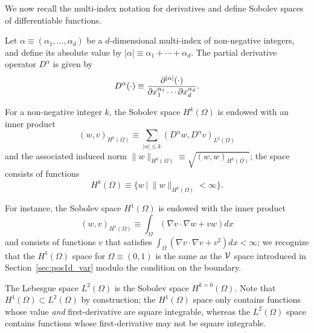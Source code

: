 We now recall the multi-index notation for derivatives and define Sobolev spaces of differentiable functions.
\begin{definition}
  Let $\alpha \equiv (\alpha_1, \dots, \alpha_d)$ be a $d$-dimensional multi-index of non-negative integers, and define its absolute value by $|\alpha| \equiv \alpha_1 + \cdots + \alpha_d$. The partial derivative operator $D^\alpha$ is given by 
  \begin{equation*}
    D^\alpha (\cdot)  \equiv \frac{\partial ^{|\alpha|} (\cdot)}{\partial x_1^{\alpha_1}  \cdots \partial x_d^{\alpha_d}}.
  \end{equation*}
\end{definition}
\begin{definition}
  For a non-negative integer $k$, the Sobolev space $H^k(\Omega)$ is endowed with an inner product
  \begin{equation*}
    (w,v)_{H^k(\Omega)} \equiv \sum_{|\alpha| \leq k} (D^\alpha w, D^\alpha v)_{L^2(\Omega)}
  \end{equation*}
  and the associated induced norm $\| w \|_{H^k(\Omega)} \equiv \sqrt{(w,w)_{H^k(\Omega)}}$; the space consists of functions
  \begin{equation*}
    H^k(\Omega) \equiv \{ w \ | \ \| w \|_{H^k(\Omega)} < \infty \}.
  \end{equation*}
\end{definition}
For instance, the Sobolev space $H^1(\Omega)$ is endowed with the inner product
\begin{equation*}
  (w,v)_{H^1(\Omega)} \equiv \int_\Omega ( \nabla v \cdot \nabla w + v w ) dx
\end{equation*}
and consists of functions $v$ that satisfies $\int_\Omega (\nabla v \cdot \nabla v + v^2) dx < \infty$; we recognize that the $H^1(\Omega)$ space for $\Omega \equiv (0,1)$ is the same as the $\mathcal{V}$ space introduced in Section~\ref{sec:pos1d_var} modulo the condition on the boundary.
 
The Lebesgue space $L^2(\Omega)$ is the Sobolev space $H^{k=0}(\Omega)$. Note that $H^1(\Omega) \subset L^2(\Omega)$ by construction; the $H^1(\Omega)$ space only contains functions whose value \emph{and} first-derivative are square integrable, whereas the $L^2(\Omega)$ space contains functions whose first-derivative may not be square integrable.

